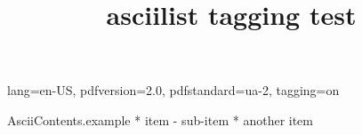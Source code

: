 \DocumentMetadata
  {
    lang=en-US,
    pdfversion=2.0,
    pdfstandard=ua-2,
    tagging=on
  }
\begin{filecontents*}[overwrite]{AsciiContents.example}
 * item
   - sub-item
 * another item
\end{filecontents*}

\documentclass{article}
\usepackage{asciilist}

\title{asciilist tagging test}



\begin{enumerate}
\item bla
\item blub
\end{enumerate}


